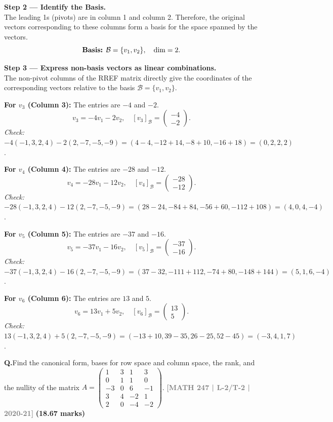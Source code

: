 \documentclass[12pt,a3paper]{article}
\newcommand{\yr}[1]{\hfill\textcolor{gray}{\small\textbf{[#1]}}}
\newcommand{\mk}[1]{\textcolor{orange!70!black}{\small\textbf{(#1 marks)}}}
\newcounter{qnum}
\newcommand{\Q}[1]{%
  \needspace{4\baselineskip}
  \refstepcounter{qnum}
  \vspace{6pt}
  \noindent\textbf{Q\theqnum.}\enspace #1\par
}
\begin{document}
\begin{tcolorbox}
\textbf{Step 2 --- Identify the Basis.} \\
The leading 1s (pivots) are in column 1 and column 2. Therefore, the original vectors corresponding to these columns form a basis for the space spanned by the vectors.
\[
\text{\textbf{Basis:} } \mathcal{B} = \{v_1, v_2\}, \quad \dim = 2.
\]

\medskip
\textbf{Step 3 --- Express non-basis vectors as linear combinations.} \\
The non-pivot columns of the RREF matrix directly give the coordinates of the corresponding vectors relative to the basis $\mathcal{B} = \{v_1, v_2\}$. 

\textbf{For $v_3$ (Column 3):} The entries are $-4$ and $-2$.
\[
\boxed{v_3 = -4v_1 - 2v_2}, \quad [v_3]_{\mathcal{B}} = \begin{pmatrix} -4 \\ -2 \end{pmatrix}.
\]
\textit{Check:} $-4(-1,3,2,4)-2(2,-7,-5,-9) = (4-4, -12+14, -8+10, -16+18) = (0,2,2,2)$. \checkmark

\textbf{For $v_4$ (Column 4):} The entries are $-28$ and $-12$.
\[
\boxed{v_4 = -28v_1 - 12v_2}, \quad [v_4]_{\mathcal{B}} = \begin{pmatrix} -28 \\ -12 \end{pmatrix}.
\]
\textit{Check:} $-28(-1,3,2,4)-12(2,-7,-5,-9) = (28-24, -84+84, -56+60, -112+108) = (4,0,4,-4)$. \checkmark

\textbf{For $v_5$ (Column 5):} The entries are $-37$ and $-16$.
\[
\boxed{v_5 = -37v_1 - 16v_2}, \quad [v_5]_{\mathcal{B}} = \begin{pmatrix} -37 \\ -16 \end{pmatrix}.
\]
\textit{Check:} $-37(-1,3,2,4)-16(2,-7,-5,-9) = (37-32, -111+112, -74+80, -148+144) = (5,1,6,-4)$. \checkmark

\textbf{For $v_6$ (Column 6):} The entries are $13$ and $5$.
\[
\boxed{v_6 = 13v_1 + 5v_2}, \quad [v_6]_{\mathcal{B}} = \begin{pmatrix} 13 \\ 5 \end{pmatrix}.
\]
\textit{Check:} $13(-1,3,2,4)+5(2,-7,-5,-9) = (-13+10, 39-35, 26-25, 52-45) = (-3,4,1,7)$. \checkmark

\end{tcolorbox}

\Q{Find the canonical form, bases for row space and column space, the rank, and the nullity of the matrix $A = \begin{pmatrix} 1 & 3 & 1 & 3 \\ 0 & 1 & 1 & 0 \\ -3 & 0 & 6 & -1 \\ 3 & 4 & -2 & 1 \\ 2 & 0 & -4 & -2 \end{pmatrix}$.
\yr{MATH 247 | L-2/T-2 | 2020-21} \mk{18.67}}
\end{document}
